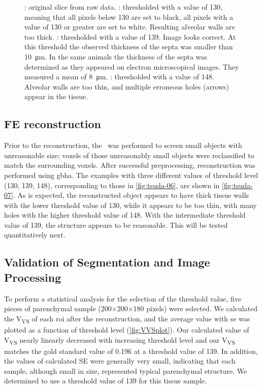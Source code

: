 \begin{figure}
{{{				\label{subfig:tsuda-06d}%
			}%
		}%
	}%
	\caption[Thresholding Influence]{: original slice from raw data. : thresholded with a value of 130, meaning that all pixels below 130 are set to black, all pixels with a value of 130 or greater are set to white. Resulting alveolar walls are too thick. : thresholded with a value of 139. Image looks correct. At this threshold the observed thickness of the septa was smaller than \SI{10}{\micro\meter}. In the same animals \cite{Roth2005} the thickness of the septa was determined as they appeared on electron microscopical images. They measured a mean of \SI{8}{\micro\meter}. : thresholded with a value of 148. Alveolar walls are too thin, and multiple erroneous holes (arrows) appear in the tissue.}
	\label{fig:tsuda-06}
\end{figure}

\subsection{FE \threed reconstruction}
Prior to the \threed reconstruction, the \ was performed to screen small objects with unreasonable size; voxels of those unreasonably small objects were reclassified to match the surrounding voxels. After successful preprocessing, \threed reconstruction was performed using \ac{gbha}. The examples with three different values of threshold level (130, 139, 148), corresponding to those in \autoref{fig:tsuda-06}, are shown in \autoref{fig:tsuda-07}. As is expected, the \threed reconstructed object appears to have thick tissue walls with the lower threshold value of 130, while it appears to be too thin, with many holes with the higher threshold value of 148. With the intermediate threshold value of 139, the structure appears to be reasonable. This will be tested quantitatively next.

\subsection{Validation of Segmentation and Image Processing}
To perform a statistical analysis for the selection of the threshold value, five pieces of parenchymal sample (200$\times$200$\times$180 pixels) were selected. We calculated the V\textsubscript{VS} of each \ac{roi} after the \threed reconstruction, and the average value with \ac{se} was plotted as a function of threshold level (\autoref{fig:VVSplot}). Our calculated value of V\textsubscript{VS} nearly linearly decreased with increasing threshold level and our V\textsubscript{VS} matches the gold standard value of 0.196 at a threshold value of 139. In addition, the values of calculated SE were generally very small, indicating that each sample, although small in size, represented typical parenchymal structure. We determined to use a threshold value of 139 for this tissue sample.

